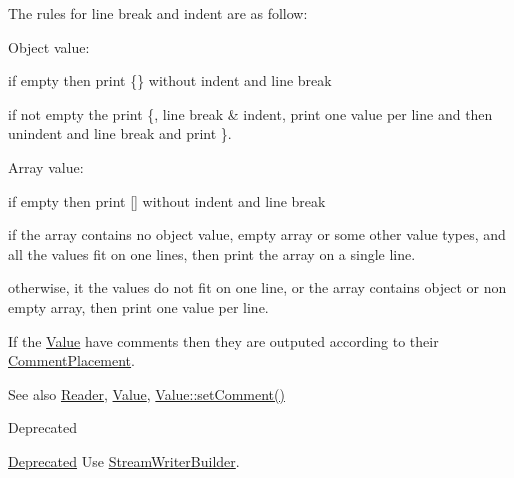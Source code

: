 The rules for line break and indent are as follow\+:
\begin{DoxyItemize}
\item Object value\+:
\begin{DoxyItemize}
\item if empty then print \{\} without indent and line break
\item if not empty the print \textquotesingle{}\{\textquotesingle{}, line break \& indent, print one value per line and then unindent and line break and print \textquotesingle{}\}\textquotesingle{}.
\end{DoxyItemize}
\item Array value\+:
\begin{DoxyItemize}
\item if empty then print \mbox{[}\mbox{]} without indent and line break
\item if the array contains no object value, empty array or some other value types, and all the values fit on one lines, then print the array on a single line.
\item otherwise, it the values do not fit on one line, or the array contains object or non empty array, then print one value per line.
\end{DoxyItemize}
\end{DoxyItemize}

If the \hyperlink{classJson_1_1Value}{Value} have comments then they are outputed according to their \hyperlink{namespaceJson_a4fc417c23905b2ae9e2c47d197a45351}{Comment\+Placement}.

\begin{DoxySeeAlso}{See also}
\hyperlink{classJson_1_1Reader}{Reader}, \hyperlink{classJson_1_1Value}{Value}, \hyperlink{classJson_1_1Value_a29f3a30f7e5d3af6f38d57999bf5b480}{Value\+::set\+Comment()} 
\end{DoxySeeAlso}
\begin{DoxyRefDesc}{Deprecated}
\item[\hyperlink{deprecated__deprecated000010}{Deprecated}]Use \hyperlink{classJson_1_1StreamWriterBuilder}{Stream\+Writer\+Builder}. \end{DoxyRefDesc}

